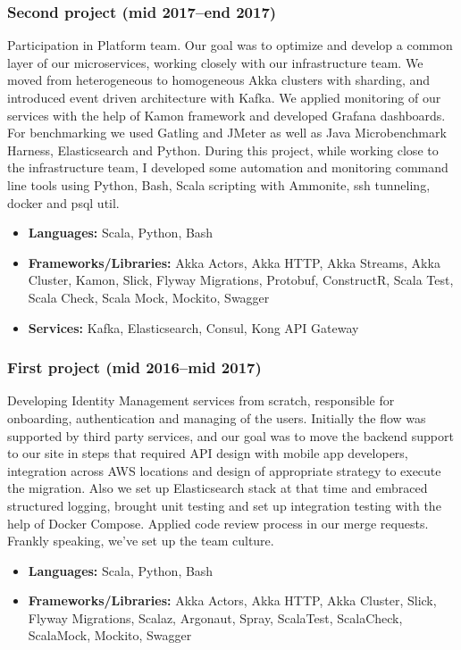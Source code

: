 \subsubsection*{Second project (mid 2017--end 2017)}
Participation in Platform team. Our goal was to optimize and develop a common layer of our microservices,
working closely with our infrastructure team. We moved from heterogeneous to homogeneous Akka clusters with sharding, and introduced event driven
architecture with Kafka. We applied monitoring of our services with the help of Kamon framework and developed Grafana dashboards. For benchmarking
we used Gatling and JMeter as well as Java Microbenchmark Harness, Elasticsearch and Python. During this project, while working close to the
infrastructure team, I developed some automation and monitoring command line tools using Python, Bash, Scala scripting with Ammonite, ssh tunneling,
docker and psql util.

\begin{itemize}[noitemsep, nosep]
  \item \textbf{Languages:} Scala, Python, Bash
  \item \textbf{Frameworks/Libraries:} Akka Actors, Akka HTTP, Akka Streams, Akka Cluster, Kamon, Slick, Flyway Migrations, Protobuf, ConstructR,
  Scala Test, Scala Check, Scala Mock, Mockito, Swagger
  \item \textbf{Services:} Kafka, Elasticsearch, Consul, Kong API Gateway
\end{itemize}

\subsubsection*{First project (mid 2016--mid 2017)}
Developing Identity Management services from scratch, responsible for onboarding, authentication and managing of
the users. Initially the flow was supported by third party services, and our goal was to move the backend support to our site in steps that required
API design with mobile app developers, integration across AWS locations and design of appropriate strategy to execute the migration. Also we set up
Elasticsearch stack at that time and embraced structured logging, brought unit testing and set up integration testing with the help of Docker Compose.
Applied code review process in our merge requests. Frankly speaking, we've set up the team culture.

\begin{itemize}[noitemsep, nosep]
  \item \textbf{Languages:} Scala, Python, Bash
  \item \textbf{Frameworks/Libraries:} Akka Actors, Akka HTTP, Akka Cluster, Slick, Flyway Migrations, Scalaz, Argonaut, Spray, ScalaTest, ScalaCheck,
  ScalaMock, Mockito, Swagger
\end{itemize}
